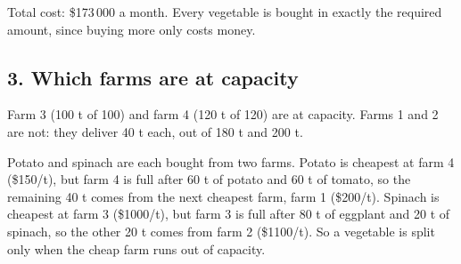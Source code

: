 \documentclass[11pt,a4paper]{article}
\begin{document}
Total cost: \$173\,000 a month. Every vegetable is bought in exactly the
required amount, since buying more only costs money.

\subsection*{3. Which farms are at capacity}

Farm 3 (100 t of 100) and farm 4 (120 t of 120) are at capacity. Farms 1 and 2
are not: they deliver 40 t each, out of 180 t and 200 t.

Potato and spinach are each bought from two farms. Potato is cheapest at farm 4
(\$150/t), but farm 4 is full after 60 t of potato and 60 t of tomato, so the
remaining 40 t comes from the next cheapest farm, farm 1 (\$200/t). Spinach is
cheapest at farm 3 (\$1000/t), but farm 3 is full after 80 t of eggplant and
20 t of spinach, so the other 20 t comes from farm 2 (\$1100/t). So a vegetable
is split only when the cheap farm runs out of capacity.
\end{document}
